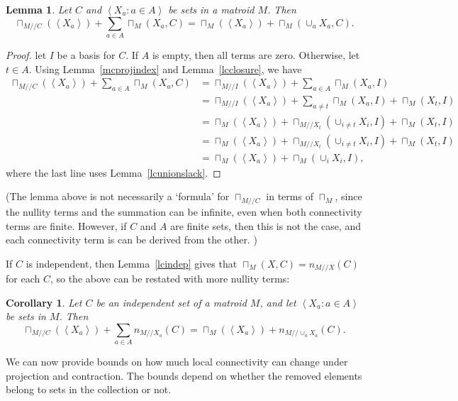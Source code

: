 \documentclass{amsart}
\theoremstyle{plain}
\newtheorem{lemma}[theorem]{Lemma}
\newtheorem{corollary}[theorem]{Corollary}
\theoremstyle{definition}
\newcommand{\dcon}{/ \!\! /}
\newcommand{\ab}[1]{\left\langle#1\right\rangle}
\begin{document}
\begin{lemma}\label{mcprojsymm}
  Let $C$ and $\ab{X_a : a \in A}$ be sets in a matroid $M$. Then   
  \[\sqcap_{M \dcon C}(\ab{X_a}) + \sum_{a \in A}\sqcap_M(X_a, C) = \sqcap_M(\ab{X_a}) + \sqcap_M(\cup_a X_a, C).\]
\end{lemma}
\begin{proof}
  let $I$ be a basis for $C$. If $A$ is empty, then all terms are zero. Otherwise, let $t \in A$.
  Using Lemma~\ref{mcprojindex} and Lemma~\ref{lcclosure}, we have 
  \begin{align*}
    \sqcap_{M \dcon C}(\ab{X_a}) + \sum_{a \in A} \sqcap_M(X_a, C)
    &= \sqcap_{M \dcon I}(\ab{X_a}) + \sum_{a \in A} \sqcap_M(X_a, I) \\ 
    &= \sqcap_{M \dcon I}(\ab{X_a}) + \sum_{a \ne t} \sqcap_M(X_a, I) + \sqcap_M(X_t, I) \\
    &= \sqcap_M(\ab{X_a}) + \sqcap_{M \dcon X_t}(\cup_{i \ne t} X_i, I) + \sqcap_M(X_t, I) \\
    &= \sqcap_M(\ab{X_a}) + \sqcap_{M \dcon X_t}(\cup_{i \ne t} X_i, I) + \sqcap_M(X_t, I) \\
    &= \sqcap_M(\ab{X_a}) + \sqcap_M(\cup_i X_i, I),
  \end{align*}
  where the last line uses Lemma~\ref{lcunionslack}. 
\end{proof}

(The lemma above is not necessarily a `formula' for $\sqcap_{M \dcon C}$ in terms of
$\sqcap_M$, since the nullity terms and the summation can be infinite, 
even when both connectivity terms are finite. However, 
if $C$ and $A$ are finite sets, then this is not the case, 
and each connectivity term is can be derived from the other. )

If $C$ is independent, then Lemma~\ref{lcindep} gives that $\sqcap_M(X, C) = n_{M \dcon X}(C)$ for each $C$, 
so the above can be restated with more nullity terms:

\begin{corollary}\label{mcprojauxindep}
  Let $C$ be an independent set of a matroid $M$, and let $\ab{X_a : a \in A}$
  be sets in $M$. Then  
  \[\sqcap_{M \dcon C}(\ab{X_a}) + \sum_{a \in A}n_{M \dcon X_a}(C) = \sqcap_M(\ab{X_a}) + n_{M \dcon \cup_a X_a}(C).\]
\end{corollary}

We can now provide bounds on how much local connectivity can change under projection 
and contraction. The bounds depend on whether the removed elements belong to sets in the collection or not. 
\end{document}

